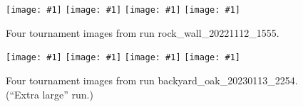 \documentclass[letterpaper]{article}
\newcommand{\runID}{\footnotesize}
\newcommand{\igfour}[1]{\texttt{[image: \#1]}}
\begin{document}


\newpage





\begin{figure}
    \igfour{20221112_1555_step_6495.png}
    \hfill
    \igfour{20221112_1555_step_5510.png}
    \hfill
    \igfour{20221112_1555_step_5681.png}
    \hfill
    \igfour{20221112_1555_step_6370.png}
    \caption{Four tournament images from run {\runID rock\_wall\_20221112\_1555}.}
    \label{fig:rock_wall_4x}
\end{figure}

\begin{figure}
    \igfour{20230115_step_6902.png}
    \hfill
    \igfour{20230115_step_7682.png}
    \hfill
    \igfour{20230115_step_7942.png}
    \hfill
    \igfour{20230115_step_12413.png}
    \caption{Four tournament images from run {\runID backyard\_oak\_20230113\_2254}. (“Extra large” run.)}
    \label{fig:backyard_oak_4x}
\end{figure}
\end{document}
